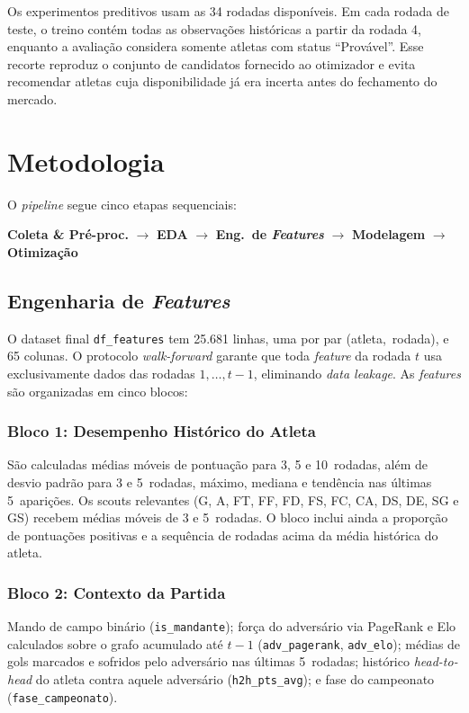 \documentclass[12pt, a4paper, oneside]{article}
\begin{document}
Os experimentos preditivos usam as 34 rodadas disponíveis. Em cada rodada de teste,
o treino contém todas as observações históricas a partir da rodada 4, enquanto a
avaliação considera somente atletas com status ``Provável''. Esse recorte reproduz
o conjunto de candidatos fornecido ao otimizador e evita recomendar atletas cuja
disponibilidade já era incerta antes do fechamento do mercado.

\section{Metodologia}
\label{sec:metodologia}

O \textit{pipeline} segue cinco etapas sequenciais:

\medskip
\noindent
\textbf{Coleta \& Pré-proc.}
$\to$ \textbf{EDA}
$\to$ \textbf{Eng.\ de \textit{Features}}
$\to$ \textbf{Modelagem}
$\to$ \textbf{Otimização}
\medskip

\subsection{Engenharia de \textit{Features}}
\label{subsec:features}

O dataset final \texttt{df\_features} tem 25.681 linhas, uma por par
(atleta,~rodada), e 65 colunas. O protocolo \textit{walk-forward} garante que toda \textit{feature}
da rodada $t$ usa exclusivamente dados das rodadas $1,\ldots,t-1$, eliminando
\textit{data leakage}. As \textit{features} são organizadas em cinco blocos:

\subsubsection*{Bloco 1: Desempenho Histórico do Atleta}
São calculadas médias móveis de pontuação para 3, 5 e 10~rodadas, além de
desvio padrão para 3 e 5~rodadas, máximo, mediana e tendência nas últimas
5~aparições. Os scouts relevantes (G, A, FT, FF, FD, FS, FC, CA, DS, DE,
SG e GS) recebem médias móveis de 3 e 5~rodadas. O bloco inclui ainda a
proporção de pontuações positivas e a sequência de rodadas acima da média
histórica do atleta.

\subsubsection*{Bloco 2: Contexto da Partida}
Mando de campo binário (\texttt{is\_mandante}); força do adversário via PageRank
e Elo calculados sobre o grafo acumulado até $t-1$
(\texttt{adv\_pagerank}, \texttt{adv\_elo}); médias de gols marcados e sofridos
pelo adversário nas últimas 5~rodadas; histórico \textit{head-to-head} do atleta
contra aquele adversário (\texttt{h2h\_pts\_avg}); e fase do campeonato
(\texttt{fase\_campeonato}).
\end{document}
